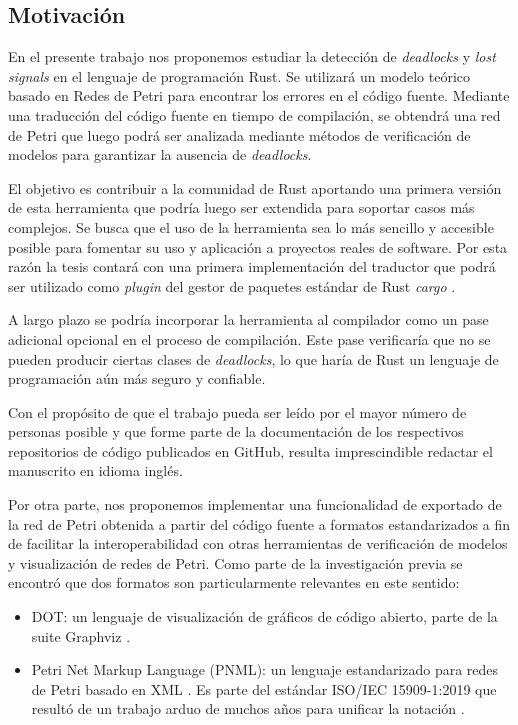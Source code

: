 \documentclass[12pt]{article}
\begin{document}
\subsection{Motivación}
\label{motivation}

En el presente trabajo nos proponemos estudiar la detección de \textit{deadlocks} y \textit{lost signals} en el lenguaje de programación Rust.
Se utilizará un modelo teórico basado en Redes de Petri para encontrar los errores en el código fuente. Mediante una traducción del código fuente
en tiempo de compilación, se obtendrá una red de Petri que luego podrá ser analizada mediante métodos de verificación de modelos para garantizar la ausencia de \textit{deadlocks}.

El objetivo es contribuir a la comunidad de Rust aportando una primera versión de esta herramienta que podría luego ser extendida para soportar casos más complejos.
Se busca que el uso de la herramienta sea lo más sencillo y accesible posible para fomentar su uso y aplicación a proyectos reales de software.
Por esta razón la tesis contará con una primera implementación del traductor que podrá ser utilizado como \textit{plugin}
del gestor de paquetes estándar de Rust \textit{cargo} \cite{cargo-website}.

A largo plazo se podría incorporar la herramienta al compilador como un pase adicional opcional en el proceso de compilación.
Este pase verificaría que no se pueden producir ciertas clases de \textit{deadlocks}, lo que haría de Rust un lenguaje de programación aún más seguro y confiable.

Con el propósito de que el trabajo pueda ser leído por el mayor número de personas posible y
que forme parte de la documentación de los respectivos repositorios de código publicados en GitHub,
resulta imprescindible redactar el manuscrito en idioma inglés.

Por otra parte, nos proponemos implementar una funcionalidad de exportado de la red de Petri obtenida a partir del código fuente
a formatos estandarizados a fin de facilitar la interoperabilidad con otras herramientas de verificación de modelos y visualización de redes de Petri.
Como parte de la investigación previa se encontró que dos formatos son particularmente relevantes en este sentido:

\begin{itemize}
    \item DOT: un lenguaje de visualización de gráficos de código abierto, parte de la suite Graphviz \cite{dot2015}.
    \item Petri Net Markup Language (PNML): un lenguaje estandarizado para redes de Petri basado en XML \cite{pnml2000}.
          Es parte del estándar ISO/IEC 15909-1:2019 que resultó de un trabajo arduo de muchos años para unificar la notación \cite{hillah:hal-01176335}.
\end{itemize}
\end{document}
